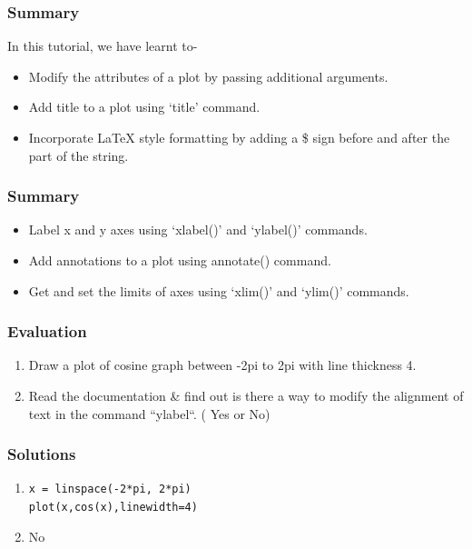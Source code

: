 \documentclass[17pt]{beamer}
\begin{document}
\begin{frame}
\frametitle{Summary}
\label{sec-11.1}
In this tutorial, we have learnt to-\pause
\begin{itemize}
\item Modify the attributes of a  plot by passing additional arguments.\pause
\item Add title to a plot using `title' command.\pause
\item Incorporate \LaTeX{} style formatting by adding a \$ sign before and after the part of the string.
\end{itemize}
\end{frame}
\begin{frame}
\frametitle{Summary}
\label{sec-11.2}
\begin{itemize}
\item Label x and y axes using `xlabel()' and `ylabel()' commands.\pause
\item Add annotations to a plot using annotate() command.\pause
\item Get and set the limits of axes using `xlim()' and `ylim()' commands.
\end{itemize}
\end{frame}
\begin{frame}
\frametitle{Evaluation}
\label{sec-12}
\begin{enumerate}
\item Draw a plot of cosine graph between -2pi to 2pi with line thickness 4.\pause
\item Read the documentation \& find out is there a way to modify the alignment of text in the command ``ylabel``. ( Yes or No)
\end{enumerate}
\end{frame}
\begin{frame}
\frametitle{Solutions}
\label{sec-13}
\begin{enumerate}
\item \texttt{x = linspace(-2*pi, 2*pi)}\\
		\texttt{plot(x,cos(x),linewidth=4)}
\item No

\end{enumerate}
\end{frame}
\end{document}
